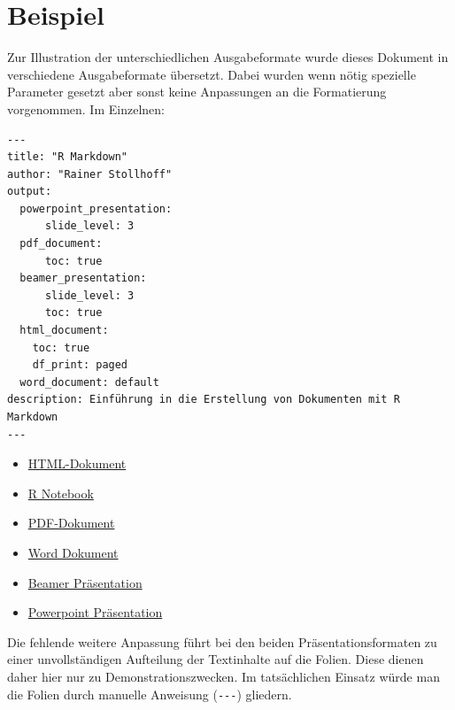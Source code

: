 \documentclass[
]{article}
\providecommand{\tightlist}{%
  \setlength{\itemsep}{0pt}\setlength{\parskip}{0pt}}
\begin{document}
\hypertarget{beispiel}{%
\section{Beispiel}\label{beispiel}}

Zur Illustration der unterschiedlichen Ausgabeformate wurde dieses
Dokument in verschiedene Ausgabeformate übersetzt. Dabei wurden wenn
nötig spezielle Parameter gesetzt aber sonst keine Anpassungen an die
Formatierung vorgenommen. Im Einzelnen:

\begin{verbatim}
---
title: "R Markdown"
author: "Rainer Stollhoff"
output:
  powerpoint_presentation:
      slide_level: 3
  pdf_document: 
      toc: true
  beamer_presentation:
      slide_level: 3
      toc: true
  html_document:
    toc: true
    df_print: paged
  word_document: default
description: Einführung in die Erstellung von Dokumenten mit R Markdown
---
\end{verbatim}

\begin{itemize}
\tightlist
\item
  \href{./markdown.html}{HTML-Dokument}
\item
  \href{./markdown.Rmd}{R Notebook}
\item
  \href{./markdown.pdf}{PDF-Dokument}
\item
  \href{./markdown.docx}{Word Dokument}
\item
  \href{./markdown_beamer.pdf}{Beamer Präsentation}
\item
  \href{./markdown.pptx}{Powerpoint Präsentation}
\end{itemize}

Die fehlende weitere Anpassung führt bei den beiden
Präsentationsformaten zu einer unvollständigen Aufteilung der
Textinhalte auf die Folien. Diese dienen daher hier nur zu
Demonstrationszwecken. Im tatsächlichen Einsatz würde man die Folien
durch manuelle Anweisung (\texttt{-\/-\/-}) gliedern.
\end{document}

